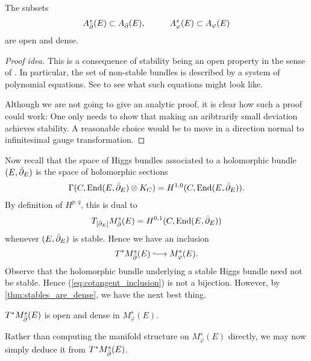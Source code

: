 \documentclass[12pt]{ociamthesis}  %
\begin{document}
\begin{theorem}\label{thm:stables_are_dense}
  The subsets
  \begin{align*}
    A^s_{\bar{\partial}}(E)\subset A_{\bar{\partial}}(E), \hspace{1cm}
    A^s_\varphi(E)\subset A_\varphi(E)
  \end{align*}
  are open and dense.
  \begin{proof}[Proof idea]
    This is a consequence of stability being an open property
    in the sense of \cite[Definition 2.1.9]{huybrechts2010}.
    In particular, the set of non-stable bundles is described by a
    system of polynomial equations. See \cite[Proposition 2.3.1]{huybrechts2010}
    to see what such equations might look like.

    Although we are not going to give an analytic proof, it is clear
    how such a proof could work: One only needs
    to show that making an aribtrarily small deviation achieves stability.
    A reasonable choice would be to move in a direction normal to infinitesimal
    gauge transformation.
  \end{proof}
\end{theorem}

Now recall that the space of Higgs bundles associated to a holomorphic
bundle $(E,{\bar{\partial}}_E)$ is the space of holomorphic sections
\begin{align*}
  \Gamma(C,\operatorname{End}(E,{\bar{\partial}}_E) \otimes K_C) = H^{1,0}(C,\operatorname{End}(E,{\bar{\partial}}_E)).
\end{align*}
By definition of $H^{p,q}$, this is dual to
\begin{align*}
  T_{[{\bar{\partial}}_E]}M^s_{\bar{\partial}}(E) = H^{0,1}(C,\operatorname{End}(E,{\bar{\partial}}_E))
\end{align*}
whenever $(E,{\bar{\partial}}_E)$ is stable. Hence we have an inclusion
\begin{align}\label{eq:cotangent_inclusion}
  T^*M^s_\dol(E) \longinc M^s_\varphi(E).
\end{align}
Observe that the holomorphic bundle underlying a stable Higgs bundle need
not be stable. Hence (\ref{eq:cotangent_inclusion}) is not a bijection.
However, by \ref{thm:stables_are_dense}, we have the next best
thing.
\begin{corollary}
  $T^*M^s_{\bar{\partial}}(E)$ is open and dense in $M^s_\varphi(E)$.
\end{corollary}

Rather than computing the manifold structure on $M^s_\varphi(E)$
directly, we may now simply deduce it from $T^*M^s_{\bar{\partial}}(E)$.
\end{document}
